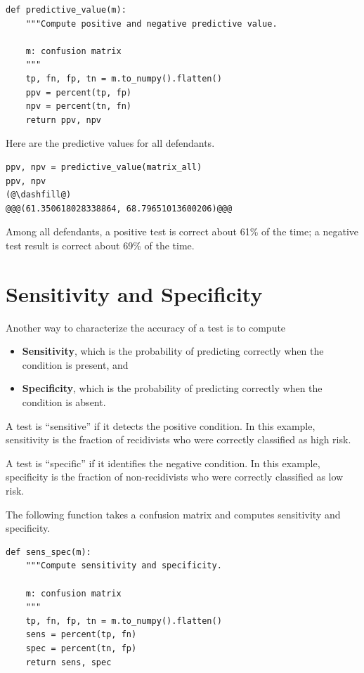 \begin{lstlisting}[]
def predictive_value(m):
    """Compute positive and negative predictive value.
    
    m: confusion matrix
    """
    tp, fn, fp, tn = m.to_numpy().flatten()
    ppv = percent(tp, fp)
    npv = percent(tn, fn)
    return ppv, npv
\end{lstlisting}

Here are the predictive values for all defendants.

\begin{lstlisting}[]
ppv, npv = predictive_value(matrix_all)
ppv, npv
(@\dashfill@)
@@@(61.350618028338864, 68.79651013600206)@@@
\end{lstlisting}

Among all defendants, a positive test is correct about 61\% of the time;
a negative test result is correct about 69\% of the time.

\hypertarget{sensitivity-and-specificity}{%
\section{Sensitivity and
Specificity}\label{sensitivity-and-specificity}}

Another way to characterize the accuracy of a test is to compute

\begin{itemize}
\item
  \textbf{Sensitivity}, which is the probability of predicting correctly
  when the condition is present, and
\item
  \textbf{Specificity}, which is the probability of predicting correctly
  when the condition is absent.
\end{itemize}

A test is ``sensitive'' if it detects the positive condition. In this
example, sensitivity is the fraction of recidivists who were correctly
classified as high risk.

A test is ``specific'' if it identifies the negative condition. In this
example, specificity is the fraction of non-recidivists who were
correctly classified as low risk.

The following function takes a confusion matrix and computes sensitivity
and specificity.

\begin{lstlisting}[]
def sens_spec(m):
    """Compute sensitivity and specificity.
    
    m: confusion matrix
    """
    tp, fn, fp, tn = m.to_numpy().flatten()
    sens = percent(tp, fn)
    spec = percent(tn, fp)
    return sens, spec
\end{lstlisting}

